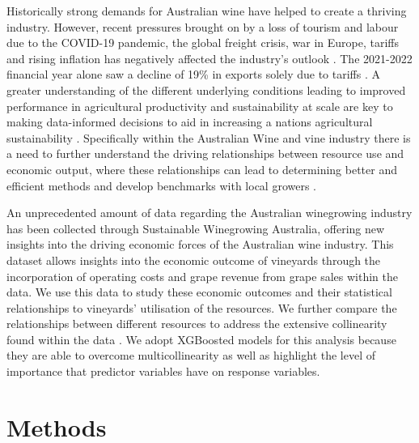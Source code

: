 \documentclass[review,12pt,authoryear]{elsarticle}
\begin{document}
\begin{linenumbers}
Historically strong demands for Australian wine have helped to create a thriving industry. However, recent pressures brought on by a loss of tourism and labour due to the COVID-19 pandemic, the global freight crisis, war in Europe, tariffs and rising inflation has negatively affected the industry's outlook \citep{wineaustraliaNationalVintageReport2021,wineaustraliaAustralianWineProduction2021}. The 2021-2022 financial year alone saw a decline of 19\% in exports solely due to tariffs \citep{wineaustraliaNationalVintageReport2022}. A greater understanding of the different underlying conditions leading to improved performance in agricultural productivity and sustainability at scale are key to making data-informed decisions to aid in increasing a nations agricultural sustainability \citep{oecdInnovationProductivitySustainability2019}. Specifically within the Australian Wine and vine industry there is a need to further understand the driving relationships between resource use and economic output, where these relationships can lead to determining better and efficient methods and develop benchmarks with local growers \citep{lukemanciniUnderstandingAustralianWine2020}.
\par
An unprecedented amount of data regarding the Australian winegrowing industry has been collected through Sustainable Winegrowing Australia, offering new insights into the driving economic forces of the Australian wine industry. This dataset allows insights into the economic outcome of vineyards through the incorporation of operating costs and grape revenue from grape sales within the data. We use this data to study these economic outcomes and their statistical relationships to vineyards' utilisation of the resources. We further compare the relationships between different resources to address the extensive collinearity found within the data \citep{chenXGBoostScalableTree2016}. We adopt XGBoosted models for this analysis because they are able to overcome multicollinearity as well as highlight the level of importance that predictor variables have on response variables.

\section{Methods}


\end{linenumbers}
\end{document}
